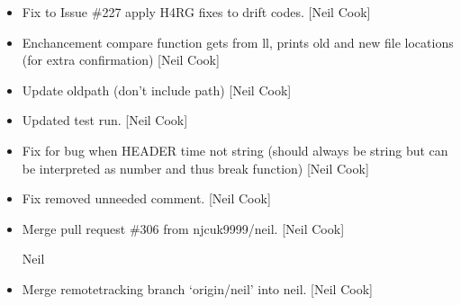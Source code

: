 \documentclass[a4paper,10pt,english]{report}
\begin{document}
\begin{itemize}
\item {} 
Fix to Issue \#227 \sphinxhyphen{} apply H4RG fixes to drift codes. {[}Neil Cook{]}

\item {} 
Enchancement \sphinxhyphen{} compare function gets  from ll, prints
old and new file locations (for extra confirmation) {[}Neil Cook{]}

\item {} 
Update oldpath (don’t include path) {[}Neil Cook{]}

\item {} 
Updated test run. {[}Neil Cook{]}

\item {} 
Fix for bug when HEADER time not string (should always be string but
can be interpreted as number and thus break function) {[}Neil Cook{]}

\item {} 
Fix \sphinxhyphen{} removed unneeded comment. {[}Neil Cook{]}

\item {} 
Merge pull request \#306 from njcuk9999/neil. {[}Neil Cook{]}

Neil

\item {} 
Merge remote\sphinxhyphen{}tracking branch ‘origin/neil’ into neil. {[}Neil Cook{]}

\end{itemize}
\end{document}
